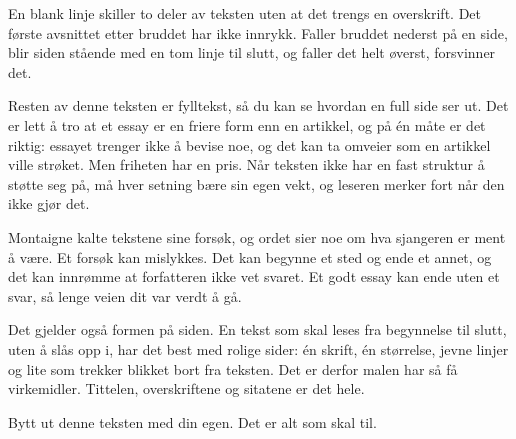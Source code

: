\documentclass[12pt]{article}
\begin{document}
\tekstbrudd

En blank linje skiller to deler av teksten uten at det trengs en overskrift. Det første avsnittet etter bruddet har ikke innrykk. Faller bruddet nederst på en side, blir siden stående med en tom linje til slutt, og faller det helt øverst, forsvinner det.

Resten av denne teksten er fylltekst, så du kan se hvordan en full side ser ut. Det er lett å tro at et essay er en friere form enn en artikkel, og på én måte er det riktig: essayet trenger ikke å bevise noe, og det kan ta omveier som en artikkel ville strøket. Men friheten har en pris. Når teksten ikke har en fast struktur å støtte seg på, må hver setning bære sin egen vekt, og leseren merker fort når den ikke gjør det.

Montaigne kalte tekstene sine forsøk, og ordet sier noe om hva sjangeren er ment å være. Et forsøk kan mislykkes. Det kan begynne et sted og ende et annet, og det kan innrømme at forfatteren ikke vet svaret. Et godt essay kan ende uten et svar, så lenge veien dit var verdt å gå.

Det gjelder også formen på siden. En tekst som skal leses fra begynnelse til slutt, uten å slås opp i, har det best med rolige sider: én skrift, én størrelse, jevne linjer og lite som trekker blikket bort fra teksten. Det er derfor malen har så få virkemidler. Tittelen, overskriftene og sitatene er det hele.

Bytt ut denne teksten med din egen. Det er alt som skal til.
\end{document}
